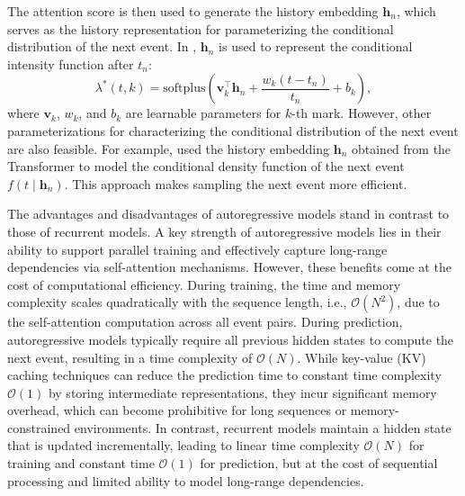 \documentclass[10pt]{article} %
\begin{document}
The attention score is then used to generate the history embedding \(\mathbf{h}_n\), which serves as the history representation for parameterizing the conditional distribution of the next event.
In \citet{simiao2020transformer,zhang2020self}, \(\mathbf{h}_n\) is used to represent the conditional intensity function after \(t_n\): 
\begin{equation}
\lambda^*(t, k) = \text{softplus}\left(\mathbf{v}_k^\top \mathbf{h}_n + \frac{w_k(t - t_n)}{t_n} + b_k\right), 
\label{attention_intensity}
\end{equation}
where $\mathbf{v}_k$, $w_k$, and $b_k$ are learnable parameters for $k$-th mark. 
However, other parameterizations for characterizing the conditional distribution of the next event are also feasible.  
For example, \citet{panosdecomposable} used the history embedding \(\mathbf{h}_n\) obtained from the Transformer to model the conditional density function of the next event \(f(t \mid \mathbf{h}_n)\). This approach makes sampling the next event more efficient.  


The advantages and disadvantages of autoregressive models stand in contrast to those of recurrent models. A key strength of autoregressive models lies in their ability to support parallel training and effectively capture long-range dependencies via self-attention mechanisms. 
However, these benefits come at the cost of computational efficiency. During training, the time and memory complexity scales quadratically with the sequence length, i.e., \(\mathcal{O}(N^2)\), due to the self-attention computation across all event pairs. During prediction, autoregressive models typically require all previous hidden states to compute the next event, resulting in a time complexity of \(\mathcal{O}(N)\). While key-value (KV) caching techniques can reduce the prediction time to constant time complexity \(\mathcal{O}(1)\) by storing intermediate representations, they incur significant memory overhead, which can become prohibitive for long sequences or memory-constrained environments. 
In contrast, recurrent models maintain a hidden state that is updated incrementally, leading to linear time complexity \(\mathcal{O}(N)\) for training and constant time \(\mathcal{O}(1)\) for prediction, but at the cost of sequential processing and limited ability to model long-range dependencies. 
\end{document}
